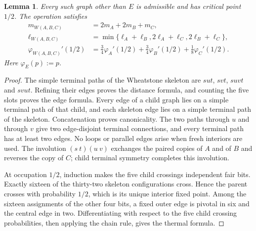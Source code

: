 \documentclass[scheme=plain,11pt]{ctexart}
\newtheorem{lemma}[theorem]{Lemma}
\theoremstyle{definition}
\theoremstyle{remark}
\begin{document}
\begin{lemma}\label{lem:wheatstone-responses}
Every such graph other than $E$ is admissible and has critical point $1/2$. The operation satisfies
\begin{align*}
 m_{W(A,B,C)}&=2m_A+2m_B+m_C,\\
 \ell_{W(A,B,C)}&=\min\{\ell_A+\ell_B,2\ell_A+\ell_C,2\ell_B+\ell_C\},\\
 \varphi_{W(A,B,C)}'(1/2)
 &=\tfrac34\varphi_A'(1/2)+\tfrac34\varphi_B'(1/2)+\tfrac18\varphi_C'(1/2).
\end{align*}
Here $\varphi_E(p):=p$.
\end{lemma}
\begin{proof}
The simple terminal paths of the Wheatstone skeleton are $sut$, $svt$, $suvt$ and $svut$. Refining their edges proves the distance formula, and counting the five slots proves the edge formula. Every edge of a child graph lies on a simple terminal path of that child, and each skeleton edge lies on a simple terminal path of the skeleton. Concatenation proves canonicality. The two paths through $u$ and through $v$ give two edge-disjoint terminal connections, and every terminal path has at least two edges. No loops or parallel edges arise when fresh interiors are used. The involution $(s\ t)(u\ v)$ exchanges the paired copies of $A$ and of $B$ and reverses the copy of $C$; child terminal symmetry completes this involution.

At occupation $1/2$, induction makes the five child crossings independent fair bits. Exactly sixteen of the thirty-two skeleton configurations cross. Hence the parent crosses with probability $1/2$, which is its unique interior fixed point. Among the sixteen assignments of the other four bits, a fixed outer edge is pivotal in six and the central edge in two. Differentiating with respect to the five child crossing probabilities, then applying the chain rule, gives the thermal formula.
\end{proof}
\end{document}
